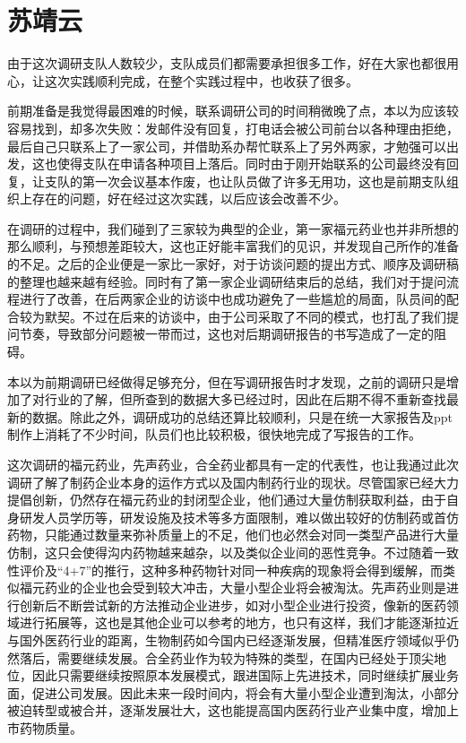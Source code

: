 \section*{苏靖云}
由于这次调研支队人数较少，支队成员们都需要承担很多工作，好在大家也都很用心，让这次实践顺利完成，在整个实践过程中，也收获了很多。

前期准备是我觉得最困难的时候，联系调研公司的时间稍微晚了点，本以为应该较容易找到，却多次失败：发邮件没有回复，打电话会被公司前台以各种理由拒绝，最后自己只联系上了一家公司，并借助系办帮忙联系上了另外两家，才勉强可以出发，这也使得支队在申请各种项目上落后。同时由于刚开始联系的公司最终没有回复，让支队的第一次会议基本作废，也让队员做了许多无用功，这也是前期支队组织上存在的问题，好在经过这次实践，以后应该会改善不少。

在调研的过程中，我们碰到了三家较为典型的企业，第一家福元药业也并非所想的那么顺利，与预想差距较大，这也正好能丰富我们的见识，并发现自己所作的准备的不足。之后的企业便是一家比一家好，对于访谈问题的提出方式、顺序及调研稿的整理也越来越有经验。同时有了第一家企业调研结束后的总结，我们对于提问流程进行了改善，在后两家企业的访谈中也成功避免了一些尴尬的局面，队员间的配合较为默契。不过在后来的访谈中，由于公司采取了不同的模式，也打乱了我们提问节奏，导致部分问题被一带而过，这也对后期调研报告的书写造成了一定的阻碍。

本以为前期调研已经做得足够充分，但在写调研报告时才发现，之前的调研只是增加了对行业的了解，但所查到的数据大多已经过时，因此在后期不得不重新查找最新的数据。除此之外，调研成功的总结还算比较顺利，只是在统一大家报告及ppt制作上消耗了不少时间，队员们也比较积极，很快地完成了写报告的工作。

这次调研的福元药业，先声药业，合全药业都具有一定的代表性，也让我通过此次调研了解了制药企业本身的运作方式以及国内制药行业的现状。尽管国家已经大力提倡创新，仍然存在福元药业的封闭型企业，他们通过大量仿制获取利益，由于自身研发人员学历等，研发设施及技术等多方面限制，难以做出较好的仿制药或首仿药物，只能通过数量来弥补质量上的不足，他们也必然会对同一类型产品进行大量仿制，这只会使得沟内药物越来越杂，以及类似企业间的恶性竞争。不过随着一致性评价及“4+7”的推行，这种多种药物针对同一种疾病的现象将会得到缓解，而类似福元药业的企业也会受到较大冲击，大量小型企业将会被淘汰。先声药业则是进行创新后不断尝试新的方法推动企业进步，如对小型企业进行投资，像新的医药领域进行拓展等，这也是其他企业可以参考的地方，也只有这样，我们才能逐渐拉近与国外医药行业的距离，生物制药如今国内已经逐渐发展，但精准医疗领域似乎仍然落后，需要继续发展。合全药业作为较为特殊的类型，在国内已经处于顶尖地位，因此只需要继续按照原本发展模式，跟进国际上先进技术，同时继续扩展业务面，促进公司发展。因此未来一段时间内，将会有大量小型企业遭到淘汰，小部分被迫转型或被合并，逐渐发展壮大，这也能提高国内医药行业产业集中度，增加上市药物质量。


